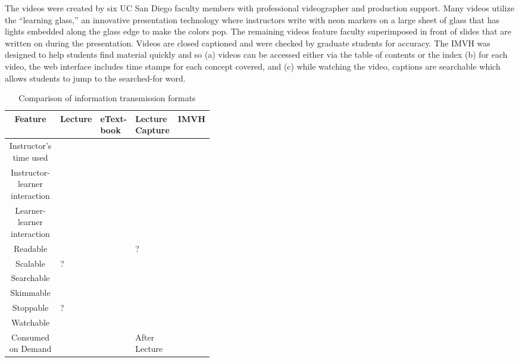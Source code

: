 \documentclass[12pt]{article}
\begin{document}
The videos were created by six UC San Diego faculty members with professional videographer and production support.
Many videos utilize the ``learning glass,'' an innovative presentation technology where instructors write with neon markers on a large sheet of glass that has lights embedded along the glass edge to make the colors pop.
The remaining videos feature faculty superimposed in front of slides that are written on during the presentation.
Videos are closed captioned and were checked by graduate students for accuracy.
The IMVH was designed to help students find material quickly and so (a) videos can be accessed either via the table of contents or the index (b) for each video, the web interface includes time stamps for each concept covered, and (c) while watching the video, captions are searchable which allows students to jump to the searched-for word.


\begin{table}
	\caption{Comparison of information transmission formats} \label{tab:tech_comparison}
	\centering
	\begin{tabular}{|c*{4}{|>{\centering\arraybackslash}m{0.1\linewidth}}|}
		\hline
		Feature & Lecture & eText-book & Lecture Capture & IMVH\\
		\hline
		Instructor's time used & \checkmark & & &\\
		Instructor-learner interaction & \checkmark & & &\\
		Learner-learner interaction & \checkmark & & & \\
		Readable & & \checkmark & ?
		& \checkmark \\
		Scalable & ?
		& \checkmark & \checkmark & \checkmark \\
		Searchable & & \checkmark & & \checkmark \\
		Skimmable & & \checkmark & & \checkmark \\
		Stoppable & ?
		& \checkmark & \checkmark & \checkmark \\
		Watchable & \checkmark & & \checkmark & \checkmark \\
		Consumed on Demand & & \checkmark & After Lecture &\checkmark \\
		\hline

	\end{tabular}
	\label{tab:infotransmission}
\end{table}
\end{document}
